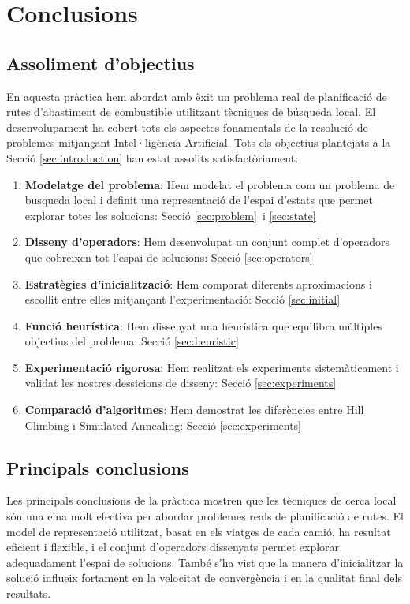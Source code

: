 \section{Conclusions}
\label{sec:conclusions}

\subsection{Assoliment d'objectius}

En aquesta pràctica hem abordat amb èxit un problema real de planificació de rutes d'abastiment de combustible utilitzant tècniques de búsqueda local. El desenvolupament ha cobert tots els aspectes fonamentals de la resolució de problemes mitjançant Intel·ligència Artificial. Tots els objectius plantejats a la Secció \ref{sec:introduction} han estat assolits satisfactòriament:

\begin{enumerate}
    \item \textbf{Modelatge del problema}: Hem modelat el problema com un problema de busqueda local i definit una representació de l'espai d'estats que permet explorar totes les solucions: Secció \ref{sec:problem}\ i \ref{sec:state} \
    
    \item \textbf{Disseny d'operadors}: Hem desenvolupat un conjunt complet d'operadors que cobreixen tot l'espai de solucions: Secció  \ref{sec:operators} \
    
    \item \textbf{Estratègies d'inicialització}: Hem comparat diferents aproximacions i escollit entre elles mitjançant l'experimentació: Secció \ref{sec:initial} \
    
    \item \textbf{Funció heurística}: Hem dissenyat una heurística que equilibra múltiples objectius del problema: Secció \ref{sec:heuristic} \
    
    \item \textbf{Experimentació rigorosa}: Hem realitzat els experiments sistemàticament i validat les nostres dessicions de disseny: Secció  \ref{sec:experiments} \
    
    \item \textbf{Comparació d'algoritmes}: Hem demostrat les diferències entre Hill Climbing i Simulated Annealing: Secció \ref{sec:experiments} \
    
\end{enumerate}


\subsection{Principals conclusions}
Les principals conclusions de la pràctica mostren que les tècniques de cerca local són una eina molt efectiva per abordar problemes reals de planificació de rutes. El model de representació utilitzat, basat en els viatges de cada camió, ha resultat eficient i flexible, i el conjunt d’operadors dissenyats permet explorar adequadament l’espai de solucions. També s’ha vist que la manera d’inicialitzar la solució influeix fortament en la velocitat de convergència i en la qualitat final dels resultats. \\

